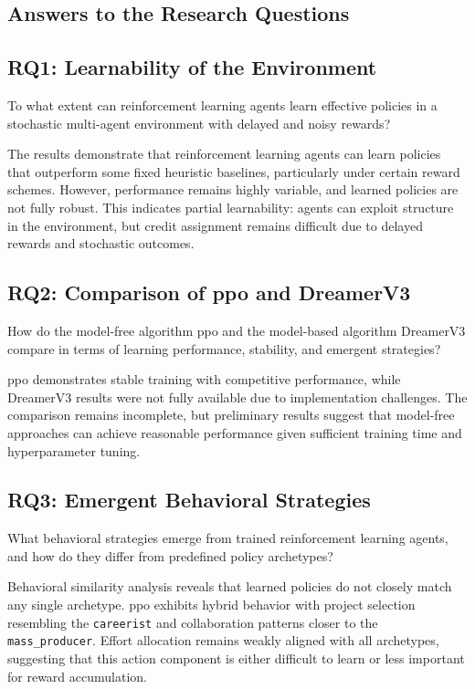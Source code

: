 \documentclass[english,bachelor]{hsluthesis}
\begin{document}
\subsection{Answers to the Research Questions}

\subsection{RQ1: Learnability of the Environment}

To what extent can reinforcement learning agents learn effective policies in a stochastic multi-agent environment with delayed and noisy rewards?

The results demonstrate that reinforcement learning agents can learn policies that outperform some fixed heuristic baselines, particularly under certain reward schemes. However, performance remains highly variable, and learned policies are not fully robust. This indicates partial learnability: agents can exploit structure in the environment, but credit assignment remains difficult due to delayed rewards and stochastic outcomes.

\subsection{RQ2: Comparison of \gls{ppo} and DreamerV3}

How do the model-free algorithm \gls{ppo} and the model-based algorithm DreamerV3 compare in terms of learning performance, stability, and emergent strategies?

\gls{ppo} demonstrates stable training with competitive performance, while DreamerV3 results were not fully available due to implementation challenges. The comparison remains incomplete, but preliminary results suggest that model-free approaches can achieve reasonable performance given sufficient training time and hyperparameter tuning.

\subsection{RQ3: Emergent Behavioral Strategies}

What behavioral strategies emerge from trained reinforcement learning agents, and how do they differ from predefined policy archetypes?

Behavioral similarity analysis reveals that learned policies do not closely match any single archetype. \gls{ppo} exhibits hybrid behavior with project selection resembling the \texttt{careerist} and collaboration patterns closer to the \texttt{mass\_producer}. Effort allocation remains weakly aligned with all archetypes, suggesting that this action component is either difficult to learn or less important for reward accumulation.
\end{document}

